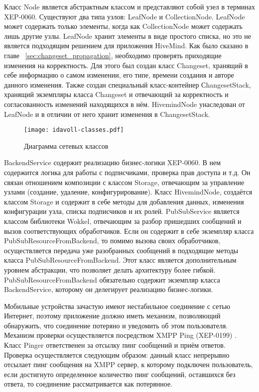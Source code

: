 Класс Node является абстрактным классом и представляют собой узел в терминах
XEP-0060. Существуют два типа узлов: LeafNode и CollectionNode. LeafNode может
содержать только элементы, когда как CollectionNode может содержать лишь другие
узлы. LeafNode хранит элементы в виде простого списка, но это не является
подходящим решением для приложения HiveMind. Как было сказано в главе
~\ref{sec:changeset_propagation}, необходимо проверять приходящие изменения на
корректность. Для этого был создан класс Changeset, хранящий в себе информацию о
самом изменении, его типе, времени создания и авторе данного изменения. Также
создан специальный класс-контейнер СhangesetStack, хранящий экземпляры класса
Changeset и отвечающий за корректность и согласованность изменений находящихся в
нём. HivemindNode унаследован от LeafNode и в отличии от него хранит изменения в
ChangesetStack.

\begin{figure}
  \centering
  \texttt{[image: idavoll-classes.pdf]}
  \caption{Диаграмма сетевых классов}
  \label{img:network_classes}
\end{figure}

BackendService содержит реализацию бизнес-логики XEP-0060. В нем содержится
логика для работы с подписчиками, проверка прав доступа и т.д. Он связан
отношением композиции с классом Storage, отвечающим за управление узлами
(создание, удаление, конфигурирование). Класс HivemindNode, создаётся классом
Storage и содержит в себе методы для добавления данных, изменения конфигурации
узла, списка подписчиков и их ролей. PubSubService является классом библиотеки
Wokkel, отвечающим за разбор пришедших сообщений и вызов соответствующих
обработчиков. Если он содержит в себе экземпляр класса
PubSubResourceFromBackend, то помимо вызова своих обработчиков, осуществляется
передача уже разобранных сообщений в подходящие методы класса
PubSubResourceFromBackend. Этот класс является дополнительным уровнем
абстракции, что позволяет делать архитектуру более гибкой.
PubSubResourceFromBackend обязательно содержит экземпляр класса BackendService,
которому он делегирует реализацию бизнес-логики.

Мобильные устройства зачастую имеют нестабильное соединение с сетью Интернет,
поэтому приложение должно иметь механизм, позволяющий обнаружить, что соединение
потеряно и уведомить об этом пользователя. Механизм проверки осуществляется
посредством XMPP Ping (XEP-0199) \cite{xep-0199}. Класс Pinger
ответственен за отсылку пинг сообщений и приём ответов. Проверка осуществляется
следующим образом: данный класс непрерывно отсылает пинг сообщения на XMPP
сервер, к которому подключен пользователь, если достигнуто определенное
количество пинг сообщений, оставшихся без ответа, то соединение рассматривается
как потерянное.

